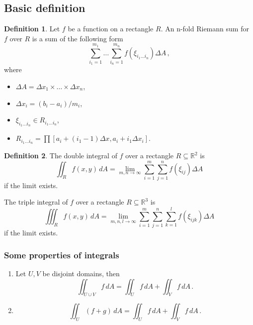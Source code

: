\documentclass[
]{article}
\theoremstyle{definition}
\newtheorem{definition}{Definition}[section]
\theoremstyle{definition}
\theoremstyle{definition}
\theoremstyle{definition}
\theoremstyle{remark}
\begin{document}
\subsection{Basic definition}\label{basic-definition}

\begin{definition}

Let \(f\) be a function on a rectangle \(R\).
An n-fold Riemann sum for \(f\) over \(R\) is a sum of the following form
\begin{equation*}
 \sum_{i_1=1}^{m_1}\dots \sum_{i_n=1}^{m_n} f(\xi_{i_1\dots i_n}) \Delta A \,,
\end{equation*}
where

\begin{itemize}
\item
  \(\Delta A = \Delta x_1\times\dots \times \Delta x_n\),
\item
  \(\Delta x_i = (b_i-a_i)/m_i\),
\item
  \(\xi_{i_1\dots i_n}\in R_{i_1\dots i_n}\),
\item
  \(R_{i_1\dots i_n}= \prod [a_i + (i_1-1)\Delta x, a_i+ i_1\Delta x_i]\).
\end{itemize}

\end{definition}

\begin{definition}
The double integral of \(f\) over a rectangle \(R \subseteq \mathbb{R}^2\) is
\begin{equation*}
    \iint_{R} f(x,y) \, dA = \lim_{m,n\to \infty} \sum_{i=1}^m \sum_{j=1}^n f(\xi_{ij}) \Delta A 
\end{equation*}
if the limit exists.

The triple integral of \(f\) over a rectangle \(R \subseteq \mathbb{R}^3\) is
\begin{equation*}
    \iiint_{R} f(x,y) \, dA = \lim_{m,n,l\to \infty} \sum_{i=1}^m \sum_{j=1}^n \sum_{k=1}^l f(\xi_{ijk}) \Delta A 
\end{equation*}
if the limit exists.
\end{definition}

\subsubsection{Some properties of integrals}\label{some-properties-of-integrals}

\begin{enumerate}
\def\labelenumi{\arabic{enumi}.}
\item
  Let \(U, V\) be disjoint domains, then
  \begin{equation*}
  \iint_{U \cup V} f \, dA = \iint_U f \, dA + \iint_V f\, dA \,. 
  \end{equation*}
\item
  \begin{equation*}
   \iint_U (f + g) \, dA = \iint_U f \, dA + \iint_V f \, dA \,.
  \end{equation*}
\end{enumerate}
\end{document}

